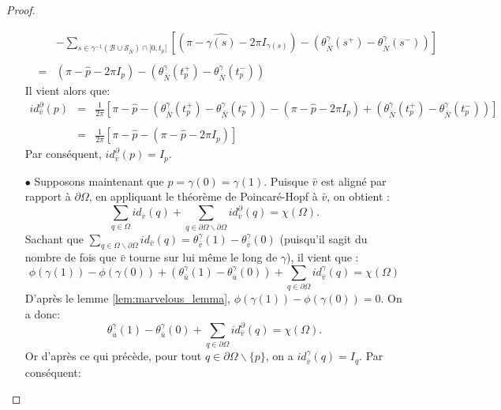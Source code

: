 \begin{proof}
\begin{itemize}
\begin{eqnarray*}
            &&-\sum_{s\in\gamma^{-1}(\mathcal{B}\cup\mathcal{S}_{\bar{N}})\cap[0, t_p[}\left[\left(\pi-\widehat{\gamma(s)}-2\pi I_{\gamma(s)}\right)-\left(\theta^{\gamma}_{\bar{N}}(s^+) - \theta^{\gamma}_{\bar{N}}(s^-)\right)\right]\\\\
            &=&\left(\pi-\widehat{p}-2\pi I_p\right)-\left(\theta^{\gamma}_{\bar{N}}(t_p^+) - \theta^{\gamma}_{\bar{N}}(t_p^-)\right)
        \end{eqnarray*}
        Il vient alors que:
        \begin{eqnarray*}
        id^\partial_{\bar{v}}(p)&=&\displaystyle\frac{1}{2\pi}\left[\pi-\widehat{p}-\left(\theta^{\gamma}_{\bar{N}}(t_p^+) - \theta^{\gamma}_{\bar{N}}(t_p^-)\right)-\left(\pi-\widehat{p}-2\pi I_p\right)+\left(\theta^{\gamma}_{\bar{N}}(t_p^+) - \theta^{\gamma}_{\bar{N}}(t_p^-)\right)\right]\\\\
        &=&\displaystyle\frac{1}{2\pi}\left[\pi-\widehat{p}-\left(\pi-\widehat{p}-2\pi I_p\right)\right]
        \end{eqnarray*}
        Par conséquent, $id^\partial_{\bar{v}}(p)=I_p$.\\
        \item[$\bullet$] Supposons maintenant que $p=\gamma(0)=\gamma(1)$. Puisque $\bar{v}$ est aligné par rapport à $\partial\Omega$, en appliquant le théorème de Poincaré-Hopf à $\bar{v}$, on obtient :
        $$
        \sum_{q\in\Omega} id_{\bar{v}}(q)+\sum_{q\in\partial\Omega\backslash\partial\Omega} id^\partial_{\bar{v}}(q)=\chi(\Omega).
        $$
        Sachant que $\sum_{q\in\Omega\backslash\partial\Omega}id_{\bar{v}}(q)=\theta_{\bar{v}}^\gamma(1)-\theta_{\bar{v}}^\gamma(0)$ (puisqu'il sagit du nombre de fois que $\bar{v}$ tourne sur lui même le long de $\gamma$), il vient que :
        $$
        \phi(\gamma(1))-\phi(\gamma(0))+\left(\theta_{\bar{u}}^\gamma(1)-\theta_{\bar{u}}^\gamma(0)\right)+\sum_{q\in\partial\Omega}id_{\bar{v}}^\gamma(q)=\chi(\Omega)
        $$
        D'après le lemme \ref{lem:marvelous_lemma}, $\phi(\gamma(1))-\phi(\gamma(0))=0$. On a donc:
        $$
        \theta_{\bar{u}}^\gamma(1)-\theta_{\bar{u}}^\gamma(0)+\sum_{q\in\partial\Omega} id^\partial_{\bar{v}}(q)=\chi(\Omega).
        $$
        Or d'après ce qui précède, pour tout $q\in\partial\Omega\backslash\{p\}$, on a $id_{\bar{v}}^\gamma(q)=I_q$. Par conséquent:

\end{itemize}
\end{proof}
